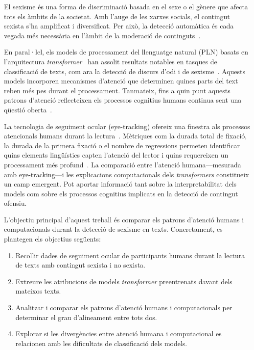 
El sexisme és una forma de discriminació basada en el sexe o el gènere que afecta tots els àmbits de la societat.
Amb l'auge de les xarxes socials, el contingut sexista s'ha amplificat i diversificat. Per això, la detecció automàtica és cada vegada més necessària en l'àmbit de la moderació de continguts~\cite{mused}.

En paral·lel, els models de processament del llenguatge natural (PLN) basats en l'arquitectura \textit{transformer}~\cite{vaswaniAttentionAllYou2017} han assolit resultats notables en tasques de classificació de texts, com ara la detecció de discurs d'odi i de sexisme~\cite{malik2025deep,gandhi2024hate,plaza2025overview}.
Aquests models incorporen mecanismes d'atenció que determinen quines parts del text reben més pes durant el processament.
Tanmateix, fins a quin punt aquests patrons d'atenció reflecteixen els processos cognitius humans continua sent una qüestió oberta~\cite{jainAttentionNotExplanation2019,wiegreffeAttentionNotNot2019}.

La tecnologia de seguiment ocular (eye-tracking) ofereix una finestra als processos atencionals humans durant la lectura~\cite{rayner1998eye,rayner2009eye}.
Mètriques com la durada total de fixació, la durada de la primera fixació o el nombre de regressions permeten identificar quins elements lingüístics capten l'atenció del lector i quins requereixen un processament més profund~\cite{clifton2007eye}.
La comparació entre l'atenció humana---mesurada amb eye-tracking---i les explicacions computacionals dels \textit{transformers} constitueix un camp emergent. Pot aportar informació tant sobre la interpretabilitat dels models com sobre els processos cognitius implicats en la detecció de contingut ofensiu.


L'objectiu principal d'aquest treball és comparar els patrons d'atenció humans i computacionals durant la detecció de sexisme en texts.
Concretament, es plantegen els objectius següents:

\begin{enumerate}
    \item Recollir dades de seguiment ocular de participants humans durant la lectura de texts amb contingut sexista i no sexista.
    \item Extreure les atribucions de models \textit{transformer} preentrenats davant dels mateixos texts.
    \item Analitzar i comparar els patrons d'atenció humans i computacionals per determinar el grau d'alineament entre tots dos.
    \item Explorar si les divergències entre atenció humana i computacional es relacionen amb les dificultats de classificació dels models.
\end{enumerate}
